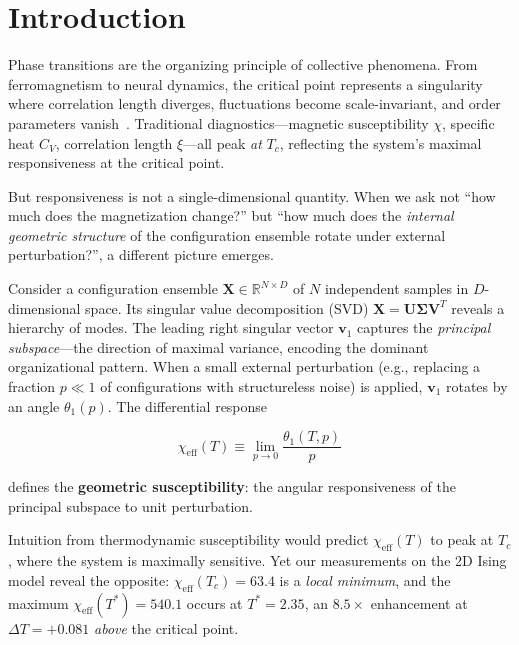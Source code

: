 \documentclass[aps,prl,twocolumn,superscriptaddress,byrevtex]{article}
\begin{document}
\section{Introduction}

Phase transitions are the organizing principle of collective phenomena. From ferromagnetism to neural dynamics, the critical point represents a singularity where correlation length diverges, fluctuations become scale-invariant, and order parameters vanish~\cite{stanley1971,binney1992}. Traditional diagnostics---magnetic susceptibility $\chi$, specific heat $C_V$, correlation length $\xi$---all peak \emph{at} $T_c$, reflecting the system's maximal responsiveness at the critical point.

But responsiveness is not a single-dimensional quantity. When we ask not ``how much does the magnetization change?'' but ``how much does the \emph{internal geometric structure} of the configuration ensemble rotate under external perturbation?'', a different picture emerges.

Consider a configuration ensemble $\mathbf{X} \in \mathbb{R}^{N \times D}$ of $N$ independent samples in $D$-dimensional space. Its singular value decomposition (SVD) $\mathbf{X} = \mathbf{U}\boldsymbol{\Sigma}\mathbf{V}^T$ reveals a hierarchy of modes. The leading right singular vector $\mathbf{v}_1$ captures the \emph{principal subspace}---the direction of maximal variance, encoding the dominant organizational pattern. When a small external perturbation (e.g., replacing a fraction $p \ll 1$ of configurations with structureless noise) is applied, $\mathbf{v}_1$ rotates by an angle $\theta_1(p)$. The differential response

\begin{equation}
\chi_{\text{eff}}(T) \equiv \lim_{p\to 0} \frac{\theta_1(T, p)}{p}
\label{eq:chi_eff_def}
\end{equation}

defines the \textbf{geometric susceptibility}: the angular responsiveness of the principal subspace to unit perturbation.

Intuition from thermodynamic susceptibility would predict $\chi_{\text{eff}}(T)$ to peak at $T_c$, where the system is maximally sensitive. Yet our measurements on the 2D Ising model reveal the opposite: $\chi_{\text{eff}}(T_c) = 63.4$ is a \emph{local minimum}, and the maximum $\chi_{\text{eff}}(T^*) = 540.1$ occurs at $T^* = 2.35$, an $8.5\times$ enhancement at $\Delta T = +0.081$ \emph{above} the critical point.
\end{document}
